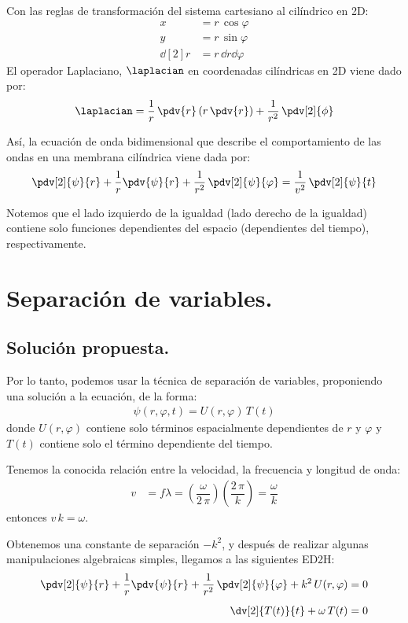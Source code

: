 Con las reglas de transformación del sistema cartesiano al cilíndrico en 2D:
\begin{align*}
x &= r \, \cos \varphi \\[0.5em]
y &= r \, \sin \varphi \\[0.5em]
\dd[2]{r} &= r \, \dd{r} \dd{\varphi}
\end{align*}
El operador Laplaciano, $\laplacian$ en coordenadas cilíndricas en 2D viene dado por:
\begin{align*}
\laplacian = \dfrac{1}{r} \, \pdv{r} \left( r \, \pdv{r} \right) + \dfrac{1}{r^{2}} \, \pdv[2]{\phi}
\end{align*}

Así, la ecuación de onda bidimensional que describe el comportamiento de las ondas en una membrana cilíndrica viene dada por:
\begin{align*}
\pdv[2]{\psi}{r} + \dfrac{1}{r} \pdv{\psi}{r} + \dfrac{1}{r^{2}} \, \pdv[2]{\psi}{\varphi} = \dfrac{1}{v^{2}} \, \pdv[2]{\psi}{t}
\end{align*}

Notemos que el lado izquierdo de la igualdad (lado derecho de la igualdad) contiene solo funciones dependientes del espacio (dependientes del tiempo), respectivamente.

\section{Separación de variables.}
\subsection{Solución propuesta.}

Por lo tanto, podemos usar la técnica de separación de variables, proponiendo una solución a la ecuación, de la forma:
\begin{align*}
\psi (r, \varphi, t) = U(r, \varphi) \, T(t)
\end{align*}
donde $U (r, \varphi)$ contiene solo términos espacialmente dependientes de $r$ y $\varphi$ y $T (t)$ contiene solo el término dependiente del tiempo.

Tenemos la conocida relación entre la velocidad, la frecuencia y longitud de onda:
\begin{align*}
v &= f \lambda = \left( \dfrac{\omega}{2 \, \pi} \right) \left( \dfrac{2 \, \pi}{k} \right) = \dfrac{\omega}{k}
\end{align*}
entonces $v \, k = \omega$.

Obtenemos una constante de separación $-k^{2}$, y después de realizar algunas manipulaciones algebraicas simples, llegamos a las siguientes ED2H:
\begin{align*}
\pdv[2]{\psi}{r} + \dfrac{1}{r} \pdv{\psi}{r} + \dfrac{1}{r^{2}} \, \pdv[2]{\psi}{\varphi} + k^{2} \, U(r, \varphi) &= 0\\[0.5em]
\dv[2]{T(t)}{t} + \omega \, T(t) &= 0
\end{align*}

